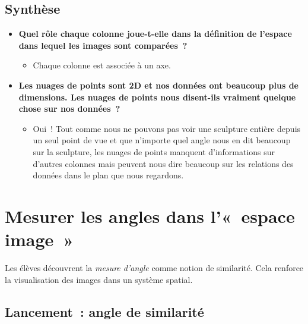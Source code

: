 \documentclass[12pt,a4paper]{article}
\begin{document}
\subsection{Synthèse}

\begin{thinkbox}
  \begin{itemize}
    \item \textbf{Quel rôle chaque colonne joue-t-elle dans la définition de l'espace dans lequel les images sont comparées~?}
    \begin{itemize}
      \item Chaque colonne est associée à un axe.
    \end{itemize}
    \item \textbf{Les nuages de points sont 2D et nos données ont beaucoup plus de dimensions. Les nuages de points nous disent-ils vraiment quelque chose sur nos données~?}
    \begin{itemize}
      \item Oui~! Tout comme nous ne pouvons pas voir une sculpture entière depuis un seul point de vue et que n'importe quel angle nous en dit beaucoup sur la sculpture, les nuages de points manquent d'informations sur d'autres colonnes mais peuvent nous dire beaucoup sur les relations des données dans le plan que nous regardons.
    \end{itemize}
  \end{itemize}
\end{thinkbox}

\newpage

\section{Mesurer les angles dans l'«~espace image~»}

\begin{overviewbox}
  Les élèves découvrent la \emph{mesure d'angle} comme notion de similarité. Cela renforce la visualisation des images dans un système spatial.
\end{overviewbox}

\subsection{Lancement~: angle de similarité}
\end{document}

